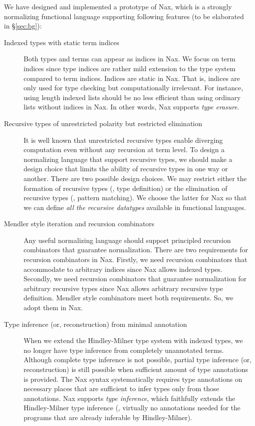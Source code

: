 We have designed and implemented a prototype of Nax, which is
a strongly normalizing functional language supporting following features
(to be elaborated in \S\ref{sec:bg}):
\begin{description}
\item[Indexed types with static term indices]
Both types and terms can appear as indices in Nax.
We focus on term indices since type indices are rather mild extension to
the type system compared to term indices.
Indices are static in Nax. That is, indices are only used for type checking
but computationally irrelevant. For instance, using length indexed lists
should be no less efficient than using ordinary lists without indices in Nax.
In other words, Nax supports \emph{type erasure}.

\item[Recursive types of unrestricted polarity but restricted elimination]
It is well known that unrestricted recursive types enable diverging computation
even without any recursion at term level. To design a normalizing language
that support recursive types, we should make a design choice that limits
the ability of recursive types in one way or another. There are two possible
design choices. We may restrict either the formation of recursive types
(\ie, type definition) or the elimination of recursive types
(\ie, pattern matching). We choose the latter for Nax so that we can
define \emph{all the recursive datatypes} available in functional languages.

\item[Mendler style iteration and recursion combinators]
Any useful normalizing language should support principled recursion
combinators that guarantee normalization. There are two requirements
for recursion combinators in Nax. Firstly, we need recursion combinators
that accommodate to arbitrary indices since Nax allows indexed types.
Secondly, we need recursion combinators that guarantee normalization for
arbitrary recursive types since Nax allows arbitrary recursive type definition.
Mendler style combinators meet both requirements. So, we adopt them in Nax.

\item[Type inference (or, reconstruction) from minimal annotation]
When we extend the Hindley-Milner type system with indexed types, we no longer
have type inference from completely unannotated terms. Although complete
type inference is not possible, partial type inference (or, reconstruction) is
still possible when sufficient amount of type annotations is provided.
The Nax syntax systematically requires type annotations on necessary places
that are sufficient to infer types only from those annotations.
Nax supports \emph{type inference}, which faithfully extends the Hindley-Milner
type inference (\ie, virtually no annotations needed for the programs that are
already inferable by Hindley-Milner).
\end{description}

